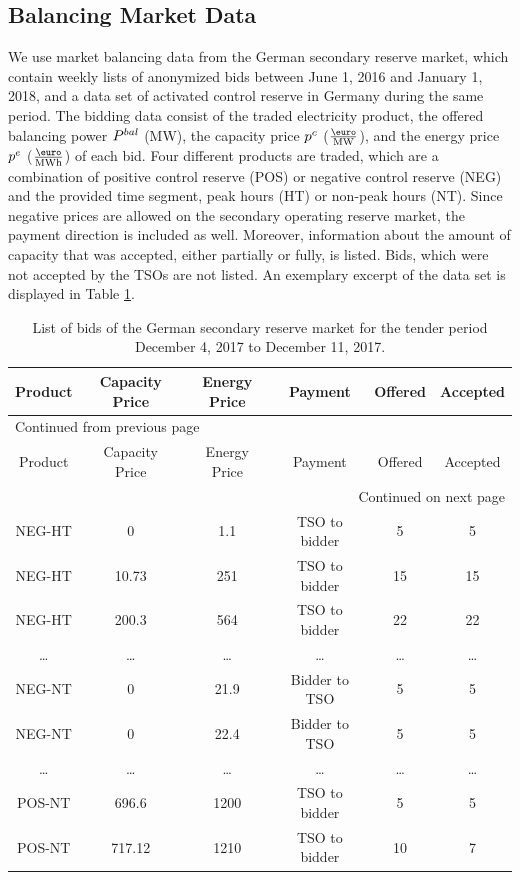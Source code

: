 \documentclass[a4paper, 12pt]{article}
\begin{document}
\subsection{Balancing Market Data \label{sec-data-balancing}}
\label{sec:orgea75a47}
We use market balancing data from the German secondary reserve market, which
contain weekly lists of anonymized bids between June 1, 2016 and January 1,
2018, and a data set of activated control reserve in Germany during the same
period. The bidding data consist of the traded electricity product, the offered
balancing power \(P^{bal}_{}\) (MW), the capacity price \(p^c_{}\) (\(\emw\)), and the
energy price \(p^e_{}\) (\(\emwh\)) of each bid. Four different products are traded,
which are a combination of positive control reserve (POS) or negative control
reserve (NEG) and the provided time segment, peak hours (HT) or non-peak hours
(NT). Since negative prices are allowed on the secondary operating reserve
market, the payment direction is included as well. Moreover, information about
the amount of capacity that was accepted, either partially or fully, is listed.
Bids, which were not accepted by the TSOs are not listed. An exemplary excerpt
of the data set is displayed in Table \ref{table-operating-reserve}.



\begin{longtable}{c|ccccc}
\caption[Secondary Operating Reserve Market Data]{List of bids of the German secondary reserve market for the tender period December 4, 2017 to December 11, 2017. \label{table-operating-reserve}}
\\
\hline
\hline
Product & Capacity Price & Energy Price & Payment & Offered & Accepted\\
\hline
\endfirsthead
\multicolumn{6}{l}{Continued from previous page} \\
\hline

Product & Capacity Price & Energy Price & Payment & Offered & Accepted \\

\hline
\endhead
\hline\multicolumn{6}{r}{Continued on next page} \\
\endfoot
\endlastfoot
\hline
NEG-HT & 0 & 1.1 & TSO to bidder & 5 & 5\\
NEG-HT & 10.73 & 251 & TSO to bidder & 15 & 15\\
NEG-HT & 200.3 & 564 & TSO to bidder & 22 & 22\\
\ldots{} & \ldots{} & \ldots{} & \ldots{} & \ldots{} & \ldots{}\\
NEG-NT & 0 & 21.9 & Bidder to TSO & 5 & 5\\
NEG-NT & 0 & 22.4 & Bidder to TSO & 5 & 5\\
\ldots{} & \ldots{} & \ldots{} & \ldots{} & \ldots{} & \ldots{}\\
POS-NT & 696.6 & 1200 & TSO to bidder & 5 & 5\\
POS-NT & 717.12 & 1210 & TSO to bidder & 10 & 7\\
\hline
\hline
\end{longtable}
\end{document}
